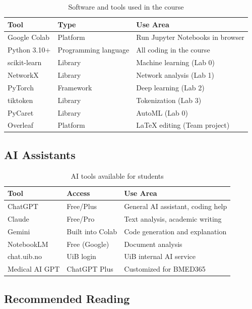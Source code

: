 \documentclass[11pt,a4paper]{article}
\begin{document}
\begin{table}[htbp]
\centering
\caption{Software and tools used in the course}
\label{tab:software}
\begin{tabular}{@{}llp{6cm}@{}}
\toprule
\textbf{Tool} & \textbf{Type} & \textbf{Use Area} \\
\midrule
Google Colab & Platform & Run Jupyter Notebooks in browser \\
Python 3.10+ & Programming language & All coding in the course \\
scikit-learn & Library & Machine learning (Lab 0) \\
NetworkX & Library & Network analysis (Lab 1) \\
PyTorch & Framework & Deep learning (Lab 2) \\
tiktoken & Library & Tokenization (Lab 3) \\
PyCaret & Library & AutoML (Lab 0) \\
Overleaf & Platform & LaTeX editing (Team project) \\
\bottomrule
\end{tabular}
\end{table}

\subsection{AI Assistants}

\begin{table}[htbp]
\centering
\caption{AI tools available for students}
\label{tab:aitools}
\begin{tabular}{@{}llp{6cm}@{}}
\toprule
\textbf{Tool} & \textbf{Access} & \textbf{Use Area} \\
\midrule
ChatGPT & Free/Plus & General AI assistant, coding help \\
Claude & Free/Pro & Text analysis, academic writing \\
Gemini & Built into Colab & Code generation and explanation \\
NotebookLM & Free (Google) & Document analysis \\
chat.uib.no & UiB login & UiB internal AI service \\
Medical AI GPT & ChatGPT Plus & Customized for BMED365 \\
\bottomrule
\end{tabular}
\end{table}

\subsection{Recommended Reading}
\end{document}
